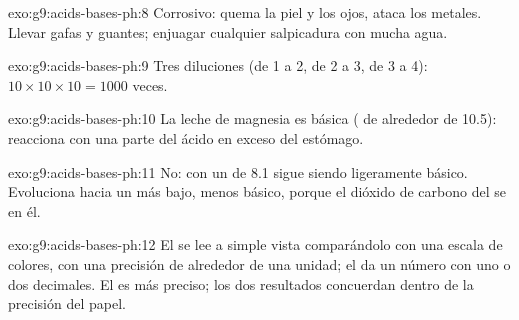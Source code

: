 \begin{solution}{exo:g9:acids-bases-ph:8}
Corrosivo: quema la piel y los ojos, ataca los metales. Llevar gafas y
guantes; enjuagar cualquier salpicadura con mucha agua.
\end{solution}

\begin{solution}{exo:g9:acids-bases-ph:9}
Tres diluciones (de 1 a 2, de 2 a 3, de 3 a 4): $10 \times 10 \times 10 =
1000$ veces.
\end{solution}

\begin{solution}{exo:g9:acids-bases-ph:10}
La leche de magnesia es básica ( de alrededor de 10.5): reacciona con
una parte del ácido en exceso del estómago.
\end{solution}

\begin{solution}{exo:g9:acids-bases-ph:11}
No: con un  de 8.1 sigue siendo ligeramente básico. Evoluciona hacia
un  más bajo, menos básico, porque el dióxido de carbono del  se
 en él.
\end{solution}

\begin{solution}{exo:g9:acids-bases-ph:12}
El  se lee a simple vista comparándolo con una escala de
colores, con una precisión de alrededor de una unidad; el  da un
número con uno o dos decimales. El  es más preciso; los dos
resultados concuerdan dentro de la precisión del papel.
\end{solution}

